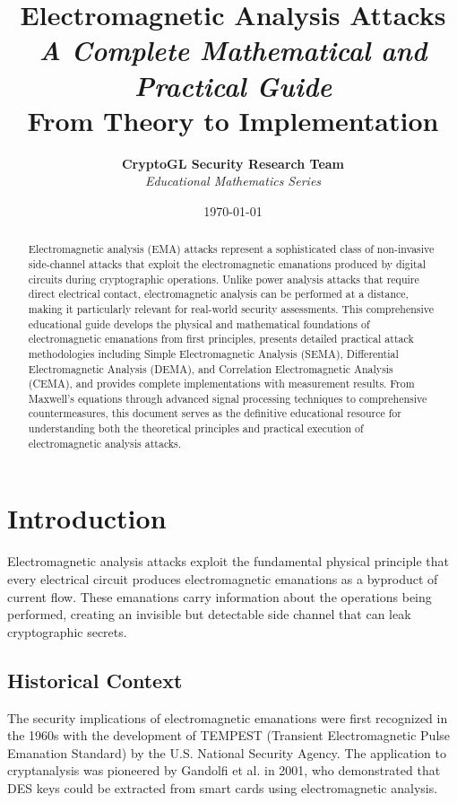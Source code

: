 \documentclass[11pt,a4paper]{article}
\title{
    \Huge\textbf{Electromagnetic Analysis Attacks} \\
    \Large\textit{A Complete Mathematical and Practical Guide} \\
    \large From Theory to Implementation
}
\author{
    \textbf{CryptoGL Security Research Team} \\
    \textit{Educational Mathematics Series}
}
\date{\today}
\theoremstyle{definition}
\begin{document}
\maketitle

\begin{abstract}
Electromagnetic analysis (EMA) attacks represent a sophisticated class of non-invasive side-channel attacks that exploit the electromagnetic emanations produced by digital circuits during cryptographic operations. Unlike power analysis attacks that require direct electrical contact, electromagnetic analysis can be performed at a distance, making it particularly relevant for real-world security assessments. This comprehensive educational guide develops the physical and mathematical foundations of electromagnetic emanations from first principles, presents detailed practical attack methodologies including Simple Electromagnetic Analysis (SEMA), Differential Electromagnetic Analysis (DEMA), and Correlation Electromagnetic Analysis (CEMA), and provides complete implementations with measurement results. From Maxwell's equations through advanced signal processing techniques to comprehensive countermeasures, this document serves as the definitive educational resource for understanding both the theoretical principles and practical execution of electromagnetic analysis attacks.
\end{abstract}

\tableofcontents
\newpage

\section{Introduction}

Electromagnetic analysis attacks exploit the fundamental physical principle that every electrical circuit produces electromagnetic emanations as a byproduct of current flow. These emanations carry information about the operations being performed, creating an invisible but detectable side channel that can leak cryptographic secrets.

\subsection{Historical Context}

The security implications of electromagnetic emanations were first recognized in the 1960s with the development of TEMPEST (Transient Electromagnetic Pulse Emanation Standard) by the U.S. National Security Agency. The application to cryptanalysis was pioneered by Gandolfi et al. \cite{gandolfi2001electromagnetic} in 2001, who demonstrated that DES keys could be extracted from smart cards using electromagnetic analysis.
\end{document}
